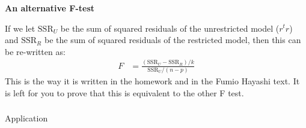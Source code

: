\begin{frame}[fragile] \frametitle{}

{\bf An alternative F-test}

If we let $\text{SSR}_U$ be the sum of squared residuals of the unrestricted
model ($r^t r$) and $\text{SSR}_R$ be the sum of squared residuals of the
restricted model, then this can be re-written as:
\begin{align*}
F &= \frac{(\text{SSR}_U -  \text{SSR}_R) / k }{\text{SSR}_U / (n - p)}
\end{align*}
This is the way it is written in the homework and in the Fumio Hayashi
text. It is left for you to prove that this is equivalent to the
other F test.

\end{frame}

\begin{frame}[fragile] \frametitle{}

\begin{flushright}
{\color{yaleblue}\sc\fontsize{1cm}{0cm}\selectfont Application}
\end{flushright}

\end{frame}













